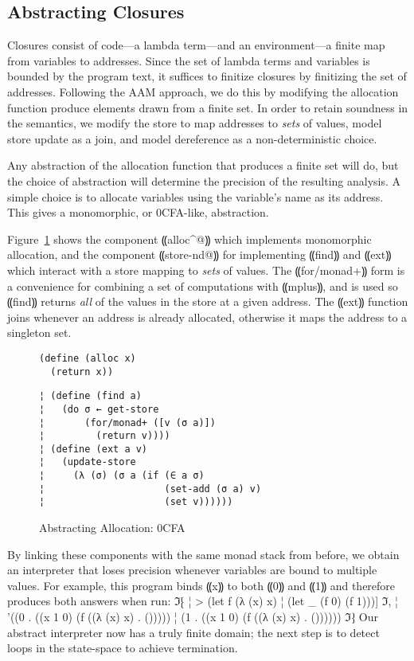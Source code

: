 \subsection{Abstracting Closures}

Closures consist of code---a lambda term---and an environment---a finite map
from variables to addresses.  Since the set of lambda terms and variables is
bounded by the program text, it suffices to finitize closures by finitizing the
set of addresses.  Following the AAM approach, we do this by modifying the
allocation function produce elements drawn from a finite set.  In order to
retain soundness in the semantics, we modify the store to map addresses to
\emph{sets} of values, model store update as a join, and model dereference as a
non-deterministic choice.

Any abstraction of the allocation function that produces a finite set will do,
but the choice of abstraction will determine the precision of the resulting
analysis.  A simple choice is to allocate variables using the variable's name
as its address.  This gives a monomorphic, or 0CFA-like, abstraction.

Figure~\ref{f:0cfa-abs} shows the component ⸨alloc^@⸩ which implements
monomorphic allocation, and the component ⸨store-nd@⸩ for implementing ⸨find⸩
and ⸨ext⸩ which interact with a store mapping to \emph{sets} of values. The
⸨for/monad+⸩ form is a convenience for combining a set of computations with
⸨mplus⸩, and is used so ⸨find⸩ returns \emph{all} of the values in the store at
a given address.  The ⸨ext⸩ function joins whenever an address is already
allocated, otherwise it maps the address to a singleton set.

\begin{figure} %
\begin{lstlisting}
(define (alloc x)
  (return x))
\end{lstlisting}
\figskip{}
\begin{lstlisting}
¦ (define (find a)
¦   (do σ ← get-store
¦       (for/monad+ ([v (σ a)])
¦         (return v))))
¦ (define (ext a v)
¦   (update-store
¦     (λ (σ) (σ a (if (∈ a σ) 
¦                     (set-add (σ a) v) 
¦                     (set v))))))
\end{lstlisting}
\caption{Abstracting Allocation: 0CFA}
\label{f:0cfa-abs}
\end{figure} %

By linking these components with the same monad stack from before, we obtain an
interpreter that loses precision whenever variables are bound to multiple
values.  For example, this program binds ⸨x⸩ to both ⸨0⸩ and ⸨1⸩ and therefore
produces both answers when run:
ℑ⁅
¦ > (let f (λ (x) x)
¦     (let _ (f 0) (f 1)))]
ℑ,
¦ '((0 . ((x 1 0) (f ((λ (x) x) . ()))))
¦   (1 . ((x 1 0) (f ((λ (x) x) . ())))))
ℑ⁆
Our abstract interpreter now has a truly finite domain; the next step is to
detect loops in the state-space to achieve termination.
